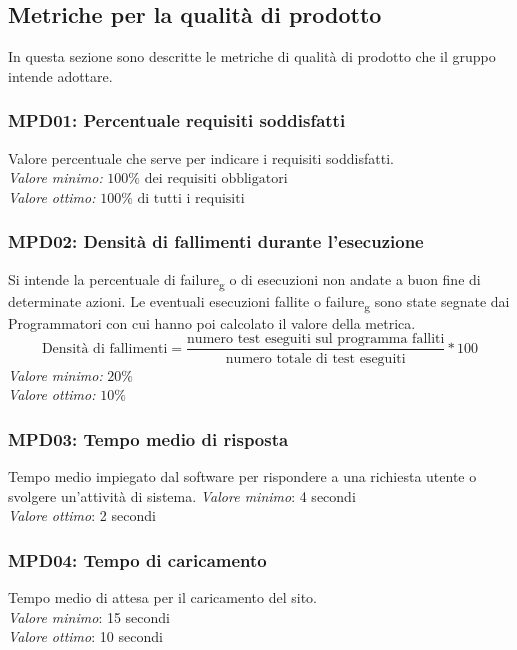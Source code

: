 \subsection{Metriche per la qualità di prodotto}
In questa sezione sono descritte le metriche di qualità di prodotto che il gruppo intende adottare.

\subsubsection{MPD01: Percentuale requisiti soddisfatti}
Valore percentuale che serve per indicare i requisiti soddisfatti.\\
\textit{Valore minimo:} $100\% \text{ dei requisiti obbligatori}$\\
\textit{Valore ottimo:} $100\% \text{ di tutti i requisiti}$

\subsubsection{MPD02: Densità di fallimenti durante l'esecuzione}
Si intende la percentuale di failure\textsubscript{g} o di esecuzioni non andate a buon fine di determinate azioni.
Le eventuali esecuzioni fallite o failure\textsubscript{g} sono state segnate dai Programmatori con cui hanno poi calcolato il valore della metrica.
\begin{equation*}
\text{Densità di fallimenti}=\frac{\text{numero test eseguiti sul programma falliti}}{\text{numero totale di test eseguiti}}*100
\end{equation*}
\textit{Valore minimo:} $20\%$\\
\textit{Valore ottimo:} $10\%$

\subsubsection{MPD03: Tempo medio di risposta}
Tempo medio impiegato dal software per rispondere a una richiesta utente o svolgere un’attività di sistema.
\textit{Valore minimo}: 4 secondi\\
\textit{Valore ottimo}: 2 secondi\\

\subsubsection{MPD04: Tempo di caricamento}
Tempo medio di attesa per il caricamento del sito.\\
\textit{Valore minimo}: 15 secondi\\
\textit{Valore ottimo}: 10 secondi\\

